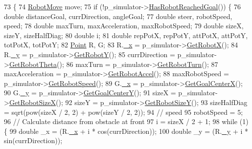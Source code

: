 \begin{DoxyCode}
73                                      \{
74   \hyperlink{structRobotMove}{RobotMove} move;
75   \textcolor{keywordflow}{if} (!p\_simulator->\hyperlink{classRobotSimulator_a2a4c5f6ce1c2388f02f9006811e6b6e0}{HasRobotReachedGoal}()) \{
76     \textcolor{keywordtype}{double} distanceGoal, currDirection, angleGoal;
77     \textcolor{keywordtype}{double} steer, robotSpeed, speed;
78     \textcolor{keywordtype}{double} maxTurn, maxAcceleration, maxRobotSpeed;
79     \textcolor{keywordtype}{double} sizeX, sizeY, sizeHalfDiag;
80     \textcolor{keywordtype}{double} i;
81     \textcolor{keywordtype}{double} repPotX, repPotY, attPotX, attPotY, totPotX, totPotY;
82     \hyperlink{structPoint}{Point} R, G;
83     R.\hyperlink{structPoint_a77b9bd094b57efb7c185fdb3fb781900}{\_x} = p\_simulator->\hyperlink{classRobotSimulator_ac7bea18d767ec267142fbc72391ca89b}{GetRobotX}();
84     R.\hyperlink{structPoint_aa8be383c30dee092979999b523373658}{\_y} = p\_simulator->\hyperlink{classRobotSimulator_a83e9060cfd1bab860ae56c80697d6de0}{GetRobotY}();
85     currDirection = p\_simulator->\hyperlink{classRobotSimulator_ade2906f35ab46657323d354ba5c7ba50}{GetRobotTheta}();
86     maxTurn = p\_simulator->\hyperlink{classRobotSimulator_a3ca3ad525b38e5f0b2ee556916058775}{GetRobotTurn}();
87     maxAcceleration = p\_simulator->\hyperlink{classRobotSimulator_a05fd185adb07605ab99da82a07028fb9}{GetRobotAccel}();
88     maxRobotSpeed = p\_simulator->\hyperlink{classRobotSimulator_a660a5fac6b81c87528aba1d3f978b75f}{GetRobotSpeed}();
89     G.\hyperlink{structPoint_a77b9bd094b57efb7c185fdb3fb781900}{\_x} = p\_simulator->\hyperlink{classRobotSimulator_a7e26ec222d3524872e4e48f2188b385f}{GetGoalCenterX}();
90     G.\hyperlink{structPoint_aa8be383c30dee092979999b523373658}{\_y} = p\_simulator->\hyperlink{classRobotSimulator_a11ef47f5c24415d1ae2422de45969910}{GetGoalCenterY}();
91     sizeX  = p\_simulator->\hyperlink{classRobotSimulator_ace930a7f7cbef97b82c08629a3319b05}{GetRobotSizeX}();
92     sizeY = p\_simulator->\hyperlink{classRobotSimulator_ae2efdc2fbc4793f205b2f4c10d4a301d}{GetRobotSizeY}();
93     sizeHalfDiag = sqrt(pow(sizeX / 2, 2) + pow(sizeY / 2, 2));
94     \textcolor{comment}{//  speed}
95     robotSpeed = 5;
96     \textcolor{comment}{//  Calculate distance from obstacle at front}
97     i = sizeX / 2 + 1;
98     \textcolor{keywordflow}{while} (1) \{
99       \textcolor{keywordtype}{double} \_x = (R.\hyperlink{structPoint_a77b9bd094b57efb7c185fdb3fb781900}{\_x} + i * cos(currDirection));
100       \textcolor{keywordtype}{double} \_y = (R.\hyperlink{structPoint_aa8be383c30dee092979999b523373658}{\_y} + i * sin(currDirection));

\end{DoxyCode}

